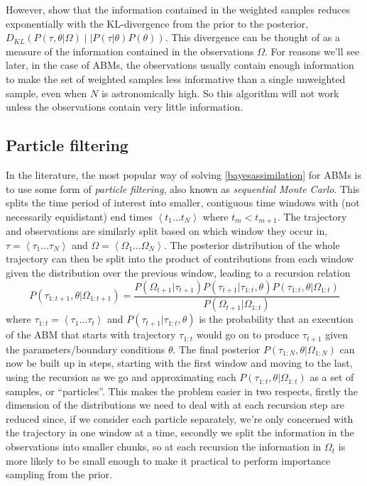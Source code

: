 \documentclass{article}
\begin{document}
However, \citet{chatterjee2018sample} show that the information contained in the weighted samples reduces exponentially with the KL-divergence from the prior to the posterior, $D_{KL}\left(P(\tau,\theta|\Omega) \mid\mid P(\tau|\theta)P(\theta) \right)$. This divergence can be thought of as a measure of the information contained in the observations $\Omega$. For reasons we'll see later, in the case of ABMs, the observations usually contain enough information to make the set of weighted samples less informative than a single unweighted sample, even when $N$ is astronomically high. So this algorithm will not work unless the observations contain very little information.

\subsection{Particle filtering}
In the literature, the most popular way of solving \eqref{bayesassimilation} for ABMs is to use some form of \textit{particle filtering}, also known as \textit{sequential Monte Carlo}. This splits the time period of interest into smaller, contiguous time windows with (not necessarily equidistant) end times $\left<t_1 \dots t_N\right>$ where $t_m < t_{m+1}$. The trajectory and observations are similarly split based on which window they occur in, $\tau = \left<\tau_1 \dots \tau_N\right>$ and $\Omega = \left<\Omega_1 \dots \Omega_N\right>$. The posterior distribution of the whole trajectory can then be split into the product of contributions from each window given the distribution over the previous window, leading to a recursion relation
\begin{equation}
P\left(\tau_{1:t+1}, \theta | \Omega_{1:t+1}\right)
=
\frac{ P(\Omega_{t+1}|\tau_{t+1})
P(\tau_{t+1}|\tau_{1:t},\theta) P\left(\tau_{1:t},\theta| \Omega_{1:t}\right)
}
{	P(\Omega_{t+1}| \Omega_{1:t}) }
\label{bayesrecursion}
\end{equation}
where $\tau_{1:t} = \left<\tau_1 \dots \tau_t\right>$ and $P(\tau_{t+1}|\tau_{1:t},\theta)$ is the probability that an execution of the ABM that starts with trajectory $\tau_{1:t}$ would go on to produce $\tau_{t+1}$ given the parameters/boundary conditions $\theta$. The final posterior $P(\tau_{1:N},\theta|\Omega_{1:N})$ can now be built up in steps, starting with the first window and moving to the last, using the recursion as we go and approximating each $P(\tau_{1:t}, \theta | \Omega_{1:t})$ as a set of samples, or ``particles''. This makes the problem easier in two respects, firstly the dimension of the distributions we need to deal with at each recursion step are reduced since, if we consider each particle separately, we're only concerned with the trajectory in one window at a time, secondly we split the information in the observations into smaller chunks, so at each recursion the information in $\Omega_t$ is more likely to be small enough to make it practical to perform importance sampling from the prior.
\end{document}
